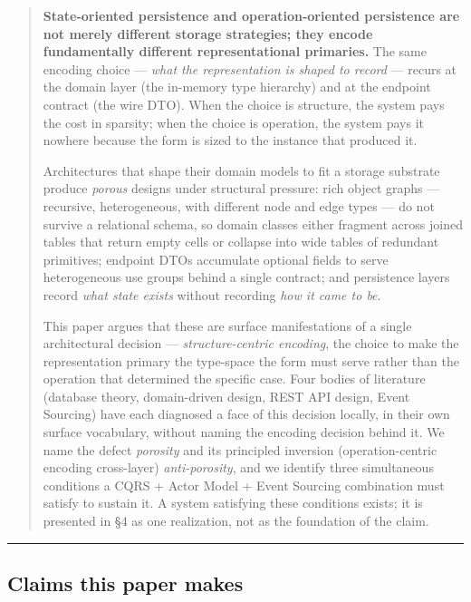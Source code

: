 \documentclass[
]{article}
\begin{document}
\begin{quote}
\textbf{State-oriented persistence and operation-oriented persistence
are not merely different storage strategies; they encode fundamentally
different representational primaries.} The same encoding choice ---
\emph{what the representation is shaped to record} --- recurs at the
domain layer (the in-memory type hierarchy) and at the endpoint contract
(the wire DTO). When the choice is structure, the system pays the cost
in sparsity; when the choice is operation, the system pays it nowhere
because the form is sized to the instance that produced it.

Architectures that shape their domain models to fit a storage substrate
produce \emph{porous} designs under structural pressure: rich object
graphs --- recursive, heterogeneous, with different node and edge types
--- do not survive a relational schema, so domain classes either
fragment across joined tables that return empty cells or collapse into
wide tables of redundant primitives; endpoint DTOs accumulate optional
fields to serve heterogeneous use groups behind a single contract; and
persistence layers record \emph{what state exists} without recording
\emph{how it came to be}.

This paper argues that these are surface manifestations of a single
architectural decision --- \emph{structure-centric encoding}, the choice
to make the representation primary the type-space the form must serve
rather than the operation that determined the specific case. Four bodies
of literature (database theory, domain-driven design, REST API design,
Event Sourcing) have each diagnosed a face of this decision locally, in
their own surface vocabulary, without naming the encoding decision
behind it. We name the defect \emph{porosity} and its principled
inversion (operation-centric encoding cross-layer) \emph{anti-porosity},
and we identify three simultaneous conditions a CQRS + Actor Model +
Event Sourcing combination must satisfy to sustain it. A system
satisfying these conditions exists; it is presented in §4 as one
realization, not as the foundation of the claim.
\end{quote}

\begin{center}\rule{0.5\linewidth}{0.5pt}\end{center}

\subsection{Claims this paper makes}\label{claims-this-paper-makes}
\end{document}
